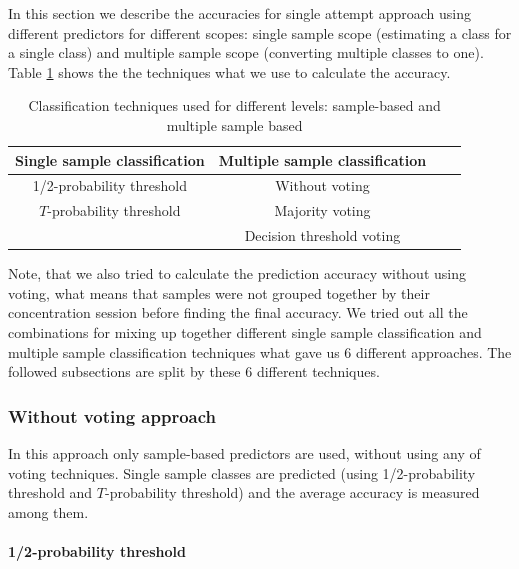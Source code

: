 \documentclass[12pt]{article}
\theoremstyle{definition}
\begin{document}
In this section we describe the accuracies for single attempt approach using different predictors for different scopes: single sample scope (estimating a class for a single class) and multiple sample scope (converting multiple classes to one). Table \ref{tab:table1} shows the the techniques what we use to calculate the accuracy. 
\begin{table}[H]
\begin{center}
  \begin{tabular}{ | c | c | c | c | }
    \hline
    \textbf{Single sample classification} & \textbf{Multiple sample classification} \\ \hline
    1/2-probability threshold & Without voting \\ \hline
	$T$-probability threshold & Majority voting \\ \hline
	& Decision threshold voting \\ \hline
  \end{tabular}
\end{center}
\caption{Classification techniques used for different levels: sample-based and multiple sample based} \label{tab:table1} 
\end{table}
Note, that we also tried to calculate the prediction accuracy without using voting, what means that samples were not grouped together by their concentration session before finding the final accuracy. We tried out all the combinations for mixing up together different single sample classification and multiple sample classification techniques what gave us 6 different approaches. The followed subsections are split by these 6 different techniques.

\subsubsection{Without voting approach}\label{no-voting}

In this approach only sample-based predictors are used, without using any of voting techniques. Single sample classes are predicted (using 1/2-probability threshold and $T$-probability threshold) and the average accuracy is measured among them. 

\paragraph{1/2-probability threshold}~\\
\end{document}
